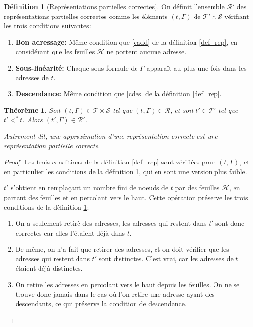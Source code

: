 \documentclass[11pt,a4paper]{article}
\theoremstyle{plain}
\newtheorem{theorem}{Théorème}
\theoremstyle{definition}
\newtheorem{definition}{Définition}
\theoremstyle{remark}
\newcommand*{\sequent}{\Gamma}
\newcommand*{\sequents}{\ensuremath{\mathcal{S}}}
\newcommand*{\trees}{\ensuremath{\mathcal{T}}}
\newcommand*{\treespartial}{\ensuremath{\mathcal{T'}}}
\newcommand*{\representationslarge}{\ensuremath{\trees \times \sequents}}
\newcommand*{\representations}{\ensuremath{\mathcal{R}}}
\newcommand*{\representationspartiallarge}{\ensuremath{\treespartial \times \sequents}}
\newcommand*{\representationspartial}{\ensuremath{\mathcal{R'}}}
\newcommand*{\relapprox}{\ensuremath{\triangleleft}}
\newcommand*{\relapproxlarge}{\ensuremath{\relapprox^*}}
\newcommand*{\unknown}{\mathcal{H}}
\begin{document}
\begin{definition}[Représentations partielles correctes]
    \label{def_rep_partial}
    On définit l'ensemble \representationspartial{} des représentations partielles correctes comme les éléments $(t, \sequent)$ de $\representationspartiallarge$ vérifiant les trois conditions suivantes:
    
    \begin{enumerate}
    \item\label{caddpartial} \textbf{Bon adressage:} Même condition que \ref{cadd} de la définition \ref{def_rep}, en considérant que les feuilles $\unknown$ ne portent aucune adresse.
    \item\label{clinpartial} \textbf{Sous-linéarité:} Chaque sous-formule de $\sequent$ apparaît au plus une fois dans les adresses de $t$.
    \item\label{cdespartial} \textbf{Descendance:} Même condition que \ref{cdes} de la définition \ref{def_rep}.
    \end{enumerate}
\end{definition}

\begin{theorem}
    Soit $(t, \sequent) \in \representationslarge$ tel que $(t, \sequent) \in \representations$, et soit $t' \in \treespartial$ tel que $t' \relapproxlarge t$. Alors $(t', \sequent) \in \representationspartial$.
    
    Autrement dit, une approximation d'une représentation correcte est une représentation partielle correcte.
\end{theorem}

\begin{proof}
    Les trois conditions de la définition \ref{def_rep} sont vérifiées pour $(t, \sequent)$, et en particulier les conditions de la définition \ref{def_rep_partial}, qui en sont une version plus faible. 
    
    $t'$ s'obtient en remplaçant un nombre fini de noeuds de $t$ par des feuilles $\unknown$, en partant des feuilles et en percolant vers le haut. Cette opération préserve les trois conditions de la définition \ref{def_rep_partial}:

    \begin{enumerate}
        \item On a seulement retiré des adresses, les adresses qui restent dans $t'$ sont donc correctes car elles l'étaient déjà dans $t$.

        \item De même, on n'a fait que retirer des adresses, et on doit vérifier que les adresses qui restent dans $t'$ sont distinctes. C'est vrai, car les adresses de $t$ étaient déjà distinctes.

        \item On retire les adresses en percolant vers le haut depuis les feuilles. On ne se trouve donc jamais dans le cas où l'on retire une adresse ayant des descendants, ce qui préserve la condition de descendance.
    \end{enumerate}
\end{proof}
\end{document}
